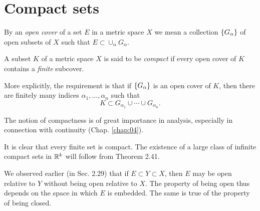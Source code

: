\section{Compact sets}


\begin{mydef}
    \label{mydef:2.31}
    By an \emph{open cover} of a set $E$ in a metric space $X$ we mean a collection $\protect\{G_{\alpha}\}$ of open subsets of $X$ such that $E \subset \cup_{\alpha} G_{\alpha}$.
\end{mydef}

\begin{mydef}
    \label{mydef:2.32}
    A subset $K$ of a metric space $X$ is said to be \emph{compact} if every open cover of $K$ contains a \emph{finite} subcover.
\end{mydef}

More explicitly, the requirement is that if $\protect\{G_{\alpha}\}$ is an open cover of $K$, then there are finitely many indices $\alpha_1, ..., \alpha_n$ such that
\begin{equation*}
    K \subset G_{\alpha_{1}} \cup \cdots \cup G_{\alpha_{n}}.
\end{equation*}

The notion of compactness is of great importance in analysis, especially
in connection with continuity (Chap. \ref{chap:04}).

It is clear that every finite set is compact. The existence of a large class of infinite compact sets in ${\protect\mathbb R}^k$ will follow from Theorem 2.41.

We observed earlier (in Sec. 2.29) that if $E \subset Y \subset X$, then $E$ may be open relative to $Y$ without being open relative to $X$. The property of being open thus depends on the space in which $E$ is embedded. The same is true of the property of being closed.

